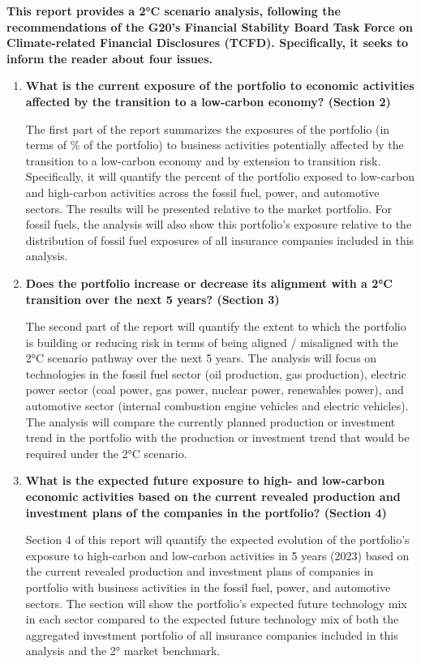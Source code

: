 \documentclass[10pt,table,a4]{article}\usepackage[]{graphicx}\usepackage[]{color}
\begin{document}
	\begin{multicols}{2}
		
		\textbf{This report provides a 2°C scenario analysis, following the recommendations of the G20's Financial Stability Board Task Force on Climate-related Financial Disclosures (TCFD). Specifically, it seeks to inform the reader about four issues.}
		
		\begin{enumerate}
			\item{\textbf{What is the current exposure of the portfolio to economic activities affected by the transition to a low-carbon economy? (Section 2) }
			}
			
			The first part of the report summarizes the exposures of the portfolio (in terms of \% of the portfolio) to business activities potentially affected by the transition to a low-carbon economy and by extension to transition risk. Specifically, it will quantify the percent of the portfolio exposed to low-carbon and high-carbon activities across the fossil fuel, power, and automotive sectors. The results will be presented relative to the market portfolio. For fossil fuels, the analysis will also show this portfolio's exposure relative to the distribution of fossil fuel exposures of all insurance companies included in this analysis.  
			
			\item{\textbf{Does the portfolio increase or decrease its alignment with a 2°C transition over the next 5 years? (Section 3)}
			}
			
			The second part of the report will quantify the extent to which the portfolio is building or reducing risk in terms of being aligned / misaligned with the 2°C scenario pathway over the next 5 years. The analysis will focus on technologies in the fossil fuel sector (oil production, gas production), electric power sector (coal power, gas power, nuclear power, renewables power), and automotive sector (internal combustion engine vehicles and electric vehicles). The analysis will compare the currently planned production or investment trend in the portfolio with the production or investment trend that would be required under the 2°C scenario. 
			
			\item{\textbf{What is the expected future exposure to high- and low-carbon economic activities based on the current revealed production and investment plans of the companies in the portfolio? (Section 4)}
			}
			
			Section 4 of this report will quantify the expected evolution of the portfolio’s exposure to high-carbon and low-carbon activities in 5 years (2023) based on the current revealed production and investment plans of companies in portfolio with business activities in the fossil fuel, power, and automotive sectors. The section will show the portfolio's expected future technology mix in each sector compared to the expected future technology mix of both the aggregated investment portfolio of all insurance companies included in this analysis and the 2° market benchmark.  
			

\end{enumerate}
\end{multicols}
\end{document}
